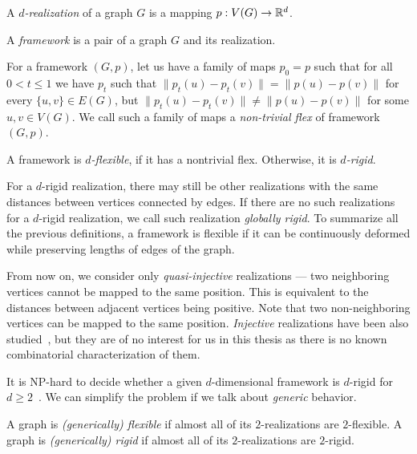 %
\begin{definition}[\( d \)-realization]
	A \emph{\( d \)-realization} of a graph \( G \) is a mapping \( p: V(G) \to \mathbb{R}^d \).
\end{definition}
%
\begin{definition}[Framework]
	A \emph{framework} is a pair of a graph \( G \) and its realization.
\end{definition}
%
\begin{definition}
	For a framework \( (G, p) \),
	let us have a family of maps \( p_0 = p \) such that for all \( 0 < t \le 1 \)
	we have \( p_t \) such that
	\( \|p_t(u) - p_t(v)\| = \|p(u) - p(v)\|\) for every \( \{u, v\} \in E(G) \),
	but \( \|p_t(u) - p_t(v)\| \ne \|p(u) - p(v)\| \) for some \( u, v \in V (G) \).
	We call such a family of maps a \emph{non-trivial flex} of framework \( (G, p) \).
\end{definition}
%
\begin{definition}
	A framework is \emph{\( d \)-flexible}, if it has a nontrivial flex.
	Otherwise, it is \emph{\( d \)-rigid}.
\end{definition}
%
For a \( d \)-rigid realization, there may still be other realizations
with the same distances between vertices connected by edges.
If there are no such realizations for a \( d \)-rigid realization,
we call such realization \emph{globally rigid}.
To summarize all the previous definitions,
a framework is flexible if it can be continuously deformed
while preserving lengths of edges of the graph.

From now on, we consider only \emph{quasi-injective} realizations ---
two neighboring vertices cannot be mapped to the same position.
This is equivalent to the distances between adjacent vertices being positive.
Note that two non-neighboring vertices can be mapped to the same position.
\emph{Injective} realizations have been also studied~\cite{injective_realizations},
but they are of no interest for us in this thesis
as there is no known combinatorial characterization of them.

It is NP-hard to decide whether a given \( d \)-dimensional framework is
\( d \)-rigid for \( d \ge 2 \)~\cite{d_rigidity_hardness}.
We can simplify the problem if we talk about \emph{generic}
behavior.
%
\begin{definition}
	A graph is \emph{(generically) flexible} if almost all of
	its \( 2 \)-realizations are \( 2 \)-flexible.
	A graph is \emph{(generically) rigid} if almost all of
	its \( 2 \)-realizations are \( 2 \)-rigid.
\end{definition}
%

